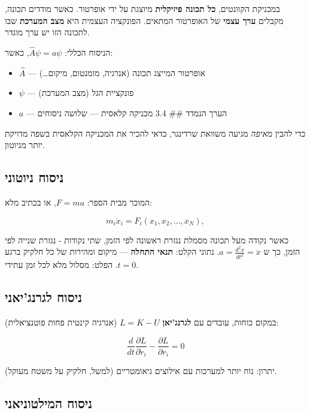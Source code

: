 \documentclass[
  hebrew,
  letterpaper,
  DIV=11,
  numbers=noendperiod]{scrreprt}
\providecommand{\tightlist}{%
  \setlength{\itemsep}{0pt}\setlength{\parskip}{0pt}}
\begin{document}
במכניקת הקוונטים, \textbf{כל תכונה פיזיקלית} מיוצגת על ידי אופרטור. כאשר
מודדים תכונה, מקבלים \textbf{ערך עצמי} של האופרטור המתאים. הפונקציה
העצמית היא \textbf{מצב המערכת} שבו לתכונה הזו יש ערך מוגדר.

הניסוח הכללי: \(\hat{A}\psi = a\psi\), כאשר:

\begin{itemize}
\tightlist
\item
  \(\hat{A}\) --- אופרטור המייצג תכונה (אנרגיה, מומנטום, מיקום\ldots)
\item
  \(\psi\) --- פונקציית הגל (מצב המערכת)
\item
  \(a\) --- הערך הנמדד \#\# 3.4 מכניקה קלאסית --- שלושה ניסוחים
\end{itemize}

כדי להבין \emph{מאיפה} מגיעה משוואת שרדינגר, כדאי להכיר את המכניקה
הקלאסית בשפה מדויקת יותר מניוטון.

\subsection{ניסוח
ניוטוני}\label{ux5e0ux5d9ux5e1ux5d5ux5d7-ux5e0ux5d9ux5d5ux5d8ux5d5ux5e0ux5d9}

המוכר מבית הספר: \(F = ma\), או בכתיב מלא:

\[m_i \ddot{x}_i = F_i(x_1, x_2, \ldots, x_N),\]

כאשר נקודה מעל תכונה מסמלת נגזרת ראשונה לפי הזמן, שתי נקודות - נגזרת
שנייה לפי הזמן, כך ש \(a = \frac{d^2 x}{dt^2} = \ddot{x}\). נתוני הקלט:
\textbf{תנאי התחלה} --- מיקום ומהירות של כל חלקיק ברגע \(t=0\). הפלט:
מסלול מלא לכל זמן עתידי.

\subsection{ניסוח
לגרנג'יאני}\label{ux5e0ux5d9ux5e1ux5d5ux5d7-ux5dcux5d2ux5e8ux5e0ux5d2ux5d9ux5d0ux5e0ux5d9}

במקום כוחות, עובדים עם \textbf{לגרנג'יאן} \(L = K - U\) (אנרגיה קינטית
פחות פוטנציאלית):

\[\frac{d}{dt}\frac{\partial L}{\partial \dot{r}_i} - \frac{\partial L}{\partial r_i} = 0\]

יתרון: נוח יותר למערכות עם אילוצים גיאומטריים (למשל, חלקיק על משטח
מעוקל).

\subsection{ניסוח
המילטוניאני}\label{ux5e0ux5d9ux5e1ux5d5ux5d7-ux5d4ux5deux5d9ux5dcux5d8ux5d5ux5e0ux5d9ux5d0ux5e0ux5d9}
\end{document}
